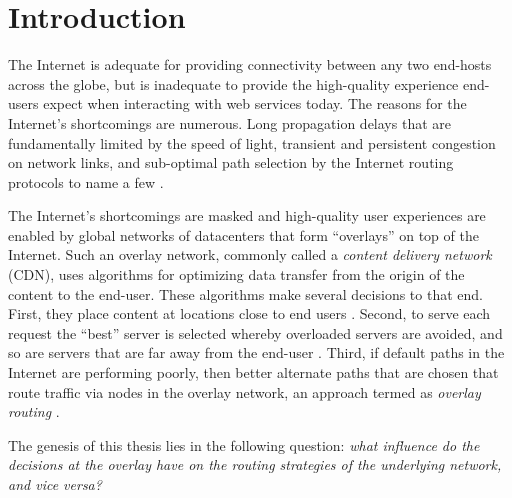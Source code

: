 \chapter{Introduction}
\label{ch:intro}




The Internet is adequate for providing connectivity between any two end-hosts across the globe, but is inadequate to provide the high-quality experience end-users  expect when interacting with web services today.  The reasons for the Internet's shortcomings are numerous. Long propagation delays that are fundamentally limited by the speed of light, transient and persistent congestion on network links, and sub-optimal path selection by the Internet routing protocols to name a few \cite{andersen2001resilient,DilleyMPPSW02,rahul2006overlays,Detour}.

The Internet's shortcomings are masked and high-quality user experiences are enabled by global networks of datacenters that form ``overlays'' on top of the Internet. Such an overlay network, commonly called a \emph{content delivery network} (CDN), uses algorithms for optimizing data transfer from the origin of the content to the end-user. These algorithms make several decisions to that end. First, they place content at locations close to end users \cite{DilleyMPPSW02}. Second, to serve each request the ``best'' server is selected whereby overloaded servers are avoided, and so are servers that are far away from  the end-user \cite{oasis}. Third, if default  paths in the Internet are performing poorly, then better alternate paths that are chosen that route traffic via nodes in the overlay network, an approach termed as \emph{overlay routing} \cite{andersen2001resilient}. 

The genesis of this thesis lies in the following question: 
\emph{what influence do the decisions at the overlay have on the routing strategies of the underlying network, and vice versa?}

